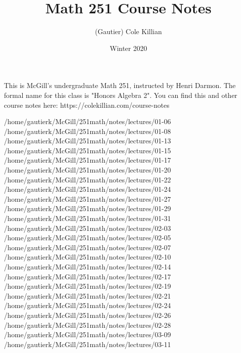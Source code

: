 \documentclass{scrartcl}
\author{(Gautier) Cole Killian}
\title{Math 251 Course Notes}
\date{Winter 2020}
\begin{document}
\maketitle

This is McGill’s undergraduate Math 251, instructed by Henri Darmon. The formal name for this class is "Honors Algebra 2". You can find this and other course notes here: https://colekillian.com/course-notes

\tableofcontents



{/home/gautierk/McGill/251math/notes/lectures/01-06}
{/home/gautierk/McGill/251math/notes/lectures/01-08}
{/home/gautierk/McGill/251math/notes/lectures/01-13}
{/home/gautierk/McGill/251math/notes/lectures/01-15}
{/home/gautierk/McGill/251math/notes/lectures/01-17}
{/home/gautierk/McGill/251math/notes/lectures/01-20}
{/home/gautierk/McGill/251math/notes/lectures/01-22}
{/home/gautierk/McGill/251math/notes/lectures/01-24}
{/home/gautierk/McGill/251math/notes/lectures/01-27}
{/home/gautierk/McGill/251math/notes/lectures/01-29}
{/home/gautierk/McGill/251math/notes/lectures/01-31}
{/home/gautierk/McGill/251math/notes/lectures/02-03}
{/home/gautierk/McGill/251math/notes/lectures/02-05}
{/home/gautierk/McGill/251math/notes/lectures/02-07}
{/home/gautierk/McGill/251math/notes/lectures/02-10}
{/home/gautierk/McGill/251math/notes/lectures/02-14}
{/home/gautierk/McGill/251math/notes/lectures/02-17}
{/home/gautierk/McGill/251math/notes/lectures/02-19}
{/home/gautierk/McGill/251math/notes/lectures/02-21}
{/home/gautierk/McGill/251math/notes/lectures/02-24}
{/home/gautierk/McGill/251math/notes/lectures/02-26}
{/home/gautierk/McGill/251math/notes/lectures/02-28}
{/home/gautierk/McGill/251math/notes/lectures/03-09}
{/home/gautierk/McGill/251math/notes/lectures/03-11}
\end{document}
